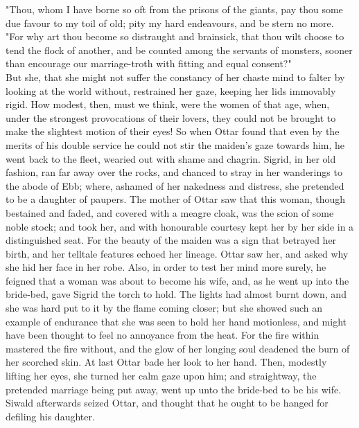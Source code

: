\documentclass[10pt,a4paper]{report}
\begin{document}
"Thou, whom I have borne so oft from the prisons of the giants, pay thou some due favour to my toil of old; pity my hard endeavours, and be stern no more.\\

"For why art thou become so distraught and brainsick, that thou wilt choose to tend the flock of another, and be counted among the servants of monsters, sooner than encourage our marriage-troth with fitting and equal consent?"\\

But she, that she might not suffer the constancy of her chaste mind to falter by looking at the world without, restrained her gaze, keeping her lids immovably rigid. How modest, then, must we think, were the women of that age, when, under the strongest provocations of their lovers, they could not be brought to make the slightest motion of their eyes! So when Ottar found that even by the merits of his double service he could not stir the maiden's gaze towards him, he went back to the fleet, wearied out with shame and chagrin. Sigrid, in her old fashion, ran far away over the rocks, and chanced to stray in her wanderings to the abode of Ebb; where, ashamed of her nakedness and distress, she pretended to be a daughter of paupers. The mother of Ottar saw that this woman, though bestained and faded, and covered with a meagre cloak, was the scion of some noble stock; and took her, and with honourable courtesy kept her by her side in a distinguished seat. For the beauty of the maiden was a sign that betrayed her birth, and her telltale features echoed her lineage. Ottar saw her, and asked why she hid her face in her robe. Also, in order to test her mind more surely, he feigned that a woman was about to become his wife, and, as he went up into the bride-bed, gave Sigrid the torch to hold. The lights had almost burnt down, and she was hard put to it by the flame coming closer; but she showed such an example of endurance that she was seen to hold her hand motionless, and might have been thought to feel no annoyance from the heat. For the fire within mastered the fire without, and the glow of her longing soul deadened the burn of her scorched skin. At last Ottar bade her look to her hand. Then, modestly lifting her eyes, she turned her calm gaze upon him; and straightway, the pretended marriage being put away, went up unto the bride-bed to be his wife. Siwald afterwards seized Ottar, and thought that he ought to be hanged for defiling his daughter.\\
\end{document}

